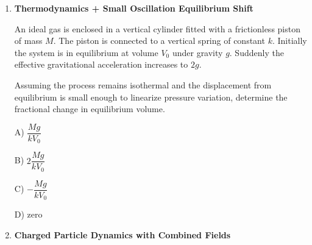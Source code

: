 \documentclass[12pt]{article}
\begin{document}
\begin{enumerate}
Acceleration is:

\begin{center}
\end{center}

A) $ \dfrac{mg-qE}{m+M} $

B) $ \dfrac{mg+qE}{m+M} $

C) $ \dfrac{mg-qE}{m} $

D) $ \dfrac{mg-qE}{m+\frac{M}{2}} $
\item \textbf{Thermodynamics + Small Oscillation Equilibrium Shift} 

An ideal gas is enclosed in a vertical cylinder fitted with a frictionless piston of mass $M$. The piston is connected to a vertical spring of constant $k$. Initially the system is in equilibrium at volume $V_0$ under gravity $g$. Suddenly the effective gravitational acceleration increases to $2g$.

Assuming the process remains isothermal and the displacement from equilibrium is small enough to linearize pressure variation, determine the fractional change in equilibrium volume.

\begin{center}
\end{center}

A) $ \dfrac{Mg}{kV_0} $

B) $ 2\dfrac{Mg}{kV_0} $

C) $ -\dfrac{Mg}{kV_0} $

D) zero

\item \textbf{Charged Particle Dynamics with Combined Fields} 


\end{enumerate}
\end{document}
